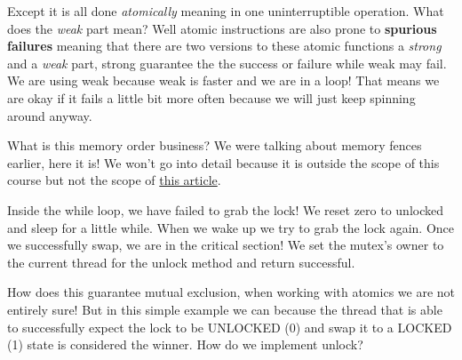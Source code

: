 Except it is all done \emph{atomically} meaning in one uninterruptible
operation. What does the \emph{weak} part mean? Well atomic instructions
are also prone to \textbf{spurious failures} meaning that there are two
versions to these atomic functions a \emph{strong} and a \emph{weak}
part, strong guarantee the the success or failure while weak may fail.
We are using weak because weak is faster and we are in a loop! That
means we are okay if it fails a little bit more often because we will
just keep spinning around anyway.

What is this memory order business? We were talking about memory fences
earlier, here it is! We won't go into detail because it is outside the
scope of this course but not the scope of
\href{https://gcc.gnu.org/wiki/Atomic/GCCMM/AtomicSync}{this article}.

Inside the while loop, we have failed to grab the lock! We reset zero to
unlocked and sleep for a little while. When we wake up we try to grab
the lock again. Once we successfully swap, we are in the critical
section! We set the mutex's owner to the current thread for the unlock
method and return successful.

How does this guarantee mutual exclusion, when working with atomics we
are not entirely sure! But in this simple example we can because the
thread that is able to successfully expect the lock to be UNLOCKED (0)
and swap it to a LOCKED (1) state is considered the winner. How do we
implement unlock?

\begin{Shaded}
\begin{Highlighting}[]
 
         \NormalTok{; }
    \NormalTok{\}}
    \NormalTok{;}
         \NormalTok{;}
    \NormalTok{\}}
     \NormalTok{;}
\NormalTok{\}}
\end{Highlighting}
\end{Shaded}

